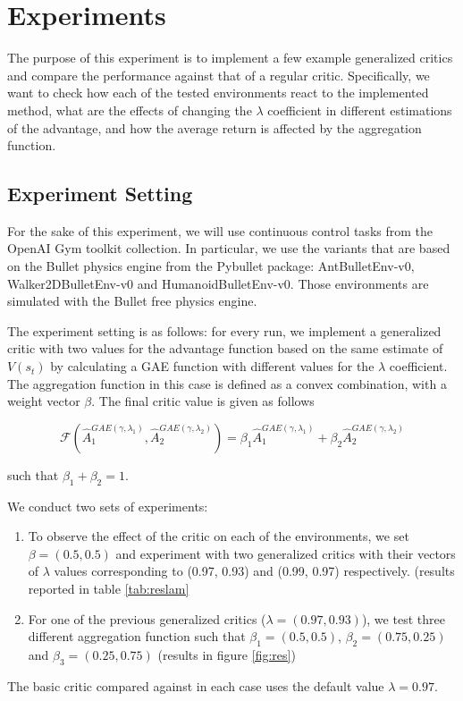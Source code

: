 \section{Experiments}
\label{sec:exp}

The purpose of this experiment is to implement a few example generalized critics and compare the performance against that of a regular critic. Specifically, we want to check how each of the tested environments react to the implemented method, what are the effects of changing the $\lambda$ coefficient in different estimations of the advantage, and how the average return is affected by the aggregation function.

\subsection{Experiment Setting}
For the sake of this experiment, we will use continuous control tasks from the OpenAI Gym \cite{brockman2016openai} toolkit collection. In particular, we use the variants that are based on the Bullet physics engine from the Pybullet package: AntBulletEnv-v0, Walker2DBulletEnv-v0 and HumanoidBulletEnv-v0. Those environments are simulated with the Bullet free physics engine.

The experiment setting is as follows: for every run, we implement a generalized critic with two values for the advantage function based on the same estimate of $V(s_t)$ by calculating a GAE function with different values for the $\lambda$ coefficient. The aggregation function in this case is defined as a convex combination, with a weight vector $\beta$. The final critic value is given as follows

\[ \mathcal{F}(\hat{A}_1^{GAE(\gamma, \lambda_1)}, \hat{A}_2^{GAE(\gamma, \lambda_2)}) = \beta_1\hat{A}_1^{GAE(\gamma, \lambda_1)}+\beta_2\hat{A}_2^{GAE(\gamma, \lambda_2)} \]

such that $\beta_1 + \beta_2 = 1$.

We conduct two sets of experiments: 
\begin{enumerate}
\item To observe the effect of the critic on each of the environments, we set $\beta=(0.5, 0.5)$ and experiment with two generalized critics with their vectors of $\lambda$ values corresponding to (0.97, 0.93) and (0.99, 0.97) respectively. (results reported in table \ref{tab:reslam}
\item For one of the previous generalized critics ($\lambda = (0.97, 0.93)$), we test three different aggregation function such that $\beta_1 = (0.5, 0.5)$, $\beta_2 = (0.75, 0.25)$ and $\beta_3 = (0.25, 0.75)$ (results in figure \ref{fig:res})
\end{enumerate}
The basic critic compared against in each case uses the default value $\lambda = 0.97$.

